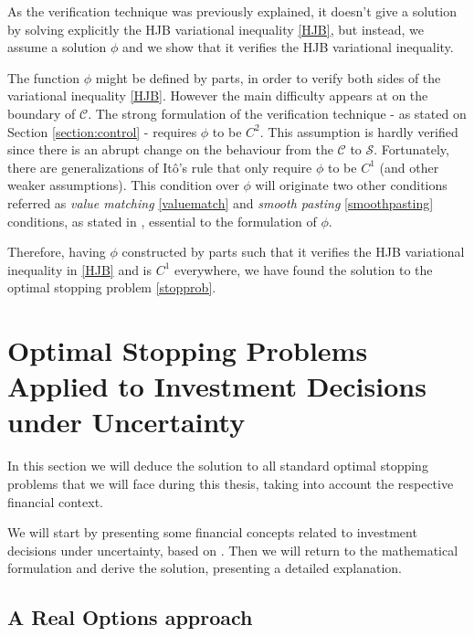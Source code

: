 As the verification technique was previously explained, it doesn't give a solution by solving explicitly the HJB variational inequality \eqref{HJB}, but instead, we assume a solution $\phi$ and we show that it verifies the HJB variational inequality.

The function $\phi$ might be defined by parts, in order to verify both sides of the variational inequality \eqref{HJB}. However the main difficulty appears at on the boundary of $\mathcal{C}$. The strong formulation of the verification technique - as stated on Section \ref{section:control} - requires $\phi$ to be $C^2$. This assumption is hardly verified since there is an abrupt change on the behaviour from the $\mathcal{C}$ to $\mathcal{S}$. Fortunately, there are generalizations of Itô's rule that only require $\phi$ to be $C^1$ (and other weaker assumptions). This condition over $\phi$ will originate two other conditions referred as \textit{value matching} \eqref{valuematch} and \textit{smooth pasting} \eqref{smoothpasting} conditions, as stated in \cite{dixit:book}, essential to the formulation of $\phi$.

Therefore, having $\phi$ constructed by parts such that it verifies the HJB variational inequality in \eqref{HJB} and is $C^1$ everywhere, we have found the solution to the optimal stopping problem \eqref{stopprob}.





\section{Optimal Stopping Problems Applied to Investment Decisions under Uncertainty}
\label{section:osro}

In this section we will deduce the solution to all standard optimal stopping problems that we will face during this thesis, taking into account the respective financial context.

We will start by presenting some financial concepts related to investment decisions under uncertainty, based on \cite{dixit:book}.
Then we will return to the mathematical formulation and derive the solution, presenting a detailed explanation.

\subsection{A Real Options approach}
\label{bc_ro}

